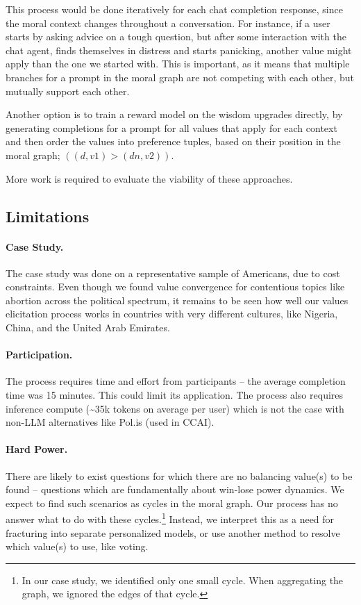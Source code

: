 \documentclass{article}
\theoremstyle{definition}
\begin{document}
This process would be done iteratively for each chat completion response, since the moral context changes throughout a conversation. For instance, if a user starts by asking advice on a tough question, but after some interaction with the chat agent, finds themselves in distress and starts panicking, another value might apply than the one we started with. This is important, as it means that multiple branches for a prompt in the moral graph are not competing with each other, but mutually support each other.

Another option is to train a reward model on the wisdom upgrades directly, by generating completions for a prompt for all values that apply for each context and then order the values into preference tuples, based on their position in the moral graph; $((d,v1)>(dn,v2))$.

More work is required to evaluate the viability of these approaches.

\subsection{Limitations}\label{sec:limitations}
\paragraph{Case Study.} The case study was done on a representative sample of Americans, due to cost constraints. Even though we found value convergence for contentious topics like abortion across the political spectrum, it remains to be seen how well our values elicitation process works in countries with very different cultures, like Nigeria, China, and the United Arab Emirates. 

\paragraph{Participation.} The process requires time and effort from participants – the average completion time was 15 minutes. This could limit its application. The process also requires inference compute (\textasciitilde35k tokens on average per user) which is not the case with non-LLM alternatives like Pol.is (used in CCAI).

\paragraph{Hard Power.} There are likely to exist questions for which there are no balancing value(s) to be found – questions which are fundamentally about win-lose power dynamics. We expect to find such scenarios as cycles in the moral graph. Our process has no answer what to do with these cycles.\footnote{In our case study, we identified only one small cycle. When aggregating the graph, we ignored the edges of that cycle.} Instead, we interpret this as a need for fracturing into separate personalized models, or use another method to resolve which value(s) to use, like voting.
\end{document}

